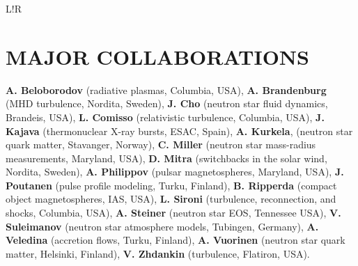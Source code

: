 \documentclass[letterpaper, onecolumn, 11pt]{article}
\newcommand\VRule{\color{lightgray}\vrule width 0.5pt}
\begin{document}
\begin{tabular}{L!{\VRule}R}
\end{tabular}


\vspace{-0.3cm}
\section*{MAJOR COLLABORATIONS}
\vspace{-0.3cm}
\textbf{A. Beloborodov} (radiative plasmas, Columbia, USA), 
\textbf{A. Brandenburg} (MHD turbulence, Nordita, Sweden), 
\textbf{J. Cho} (neutron star fluid dynamics, Brandeis, USA), 
\textbf{L. Comisso} (relativistic turbulence, Columbia, USA), 
\textbf{J. Kajava} (thermonuclear X-ray bursts, ESAC, Spain), 
\textbf{A. Kurkela}, (neutron star quark matter, Stavanger, Norway),  
\textbf{C. Miller} (neutron star mass-radius measurements, Maryland, USA), 
\textbf{D. Mitra} (switchbacks in the solar wind, Nordita, Sweden), 
\textbf{A. Philippov} (pulsar magnetospheres, Maryland, USA),  
\textbf{J. Poutanen} (pulse profile modeling, Turku, Finland), 
\textbf{B. Ripperda} (compact object magnetospheres, IAS, USA), 
\textbf{L. Sironi} (turbulence, reconnection, and shocks, Columbia, USA),  
\textbf{A. Steiner} (neutron star EOS, Tennessee USA), 
\textbf{V. Suleimanov} (neutron star atmosphere models, Tubingen, Germany), 
\textbf{A. Veledina} (accretion flows, Turku, Finland), 
\textbf{A. Vuorinen} (neutron star quark matter, Helsinki, Finland), 
\textbf{V. Zhdankin} (turbulence, Flatiron, USA).


\clearpage

\renewcommand\refname{\phantom{bla}}

\end{document}
